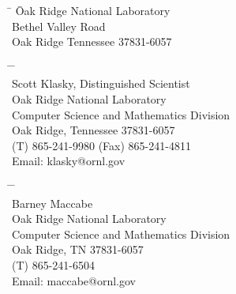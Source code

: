 \thispagestyle{empty}

\begin{center}
\textbf{\Large \baseproposaltitle}
\end{center}

\begin{center}
\end{center}

\medskip

\begin{tabbing}
\hspace*{10mm} \=  \= Oak Ridge National Laboratory \\
\>   Bethel Valley Road\\
\> \> Oak Ridge Tennessee 37831-6057\\
\end{tabbing}

\medskip

\begin{tabbing}
\hspace*{10mm} \=  \=
\vrule height0.4pt depth 0pt width 2.5in \\
\> \> Scott Klasky,  Distinguished Scientist \\
\> \> Oak Ridge National Laboratory \\
\> \> Computer Science and Mathematics Division \\
\> \> Oak Ridge, Tennessee 37831-6057 \\
\> \> (T) 865-241-9980 (Fax) 865-241-4811 \\
\> \> Email: klasky@ornl.gov
\end{tabbing}

\medskip

\begin{tabbing}
\hspace*{10mm} \=  \=
\vrule height0.4pt depth 0pt width 2.5in \\
\> \> Barney Maccabe \\
\> \> Oak Ridge National Laboratory \\
\> \> Computer Science and Mathematics Division \\
\> \> Oak Ridge, TN 37831-6057 \\
\> \> (T) 865-241-6504 \\
\> \> Email: maccabe@ornl.gov
\end{tabbing}

